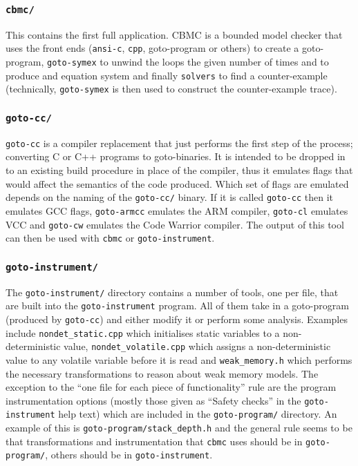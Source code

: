 \documentclass{article}
\newcommand{\dir}[1]{\texttt{#1}}
\newcommand{\file}[1]{\texttt{#1}}
\newcommand{\prog}[1]{\texttt{#1}}
\begin{document}
\subsubsection{\dir{cbmc/}}
\label{section:CBMC}

This contains the first full application.  CBMC is a bounded model
checker that uses the front ends (\dir{ansi-c}, \dir{cpp}, goto-program or others)
to create a goto-program, \dir{goto-symex} to unwind the loops the given
number of times and to produce and equation system and finally
\dir{solvers} to find a counter-example (technically, \dir{goto-symex}
is then used to construct the counter-example trace).



\subsubsection{\dir{goto-cc/}}
\label{section:goto-cc}
 
\dir{goto-cc} is a compiler replacement that just performs the first
step of the process; converting C or C++ programs to goto-binaries.
It is intended to be dropped in to an existing build procedure in
place of the compiler, thus it emulates flags that would affect the
semantics of the code produced.  Which set of flags are emulated
depends on the naming of the \dir{goto-cc/} binary.  If it is called
\prog{goto-cc} then it emulates GCC flags, \prog{goto-armcc} emulates
the ARM compiler, \prog{goto-cl} emulates VCC and \prog{goto-cw}
emulates the Code Warrior compiler.  The output of this tool can then
be used with \prog{cbmc} or \prog{goto-instrument}.




\subsubsection{\dir{goto-instrument/}}
\label{section:goto-instrument}

The \dir{goto-instrument/} directory contains a number of tools, one
per file, that are built into the \prog{goto-instrument} program.  All
of them take in a goto-program (produced by \prog{goto-cc}) and either
modify it or perform some analysis.  Examples include
\file{nondet\_static.cpp} which initialises static variables to a
non-deterministic value, \file{nondet\_volatile.cpp} which assigns
a non-deterministic value to any volatile variable before it is read
and \file{weak\_memory.h} which performs the necessary transformations
to reason about weak memory models.  The exception to the ``one file
for each piece of functionality'' rule are the program instrumentation
options (mostly those given as ``Safety checks'' in the
\prog{goto-instrument} help text) which are included in the
\prog{goto-program/} directory.  An example of this is
\file{goto-program/stack\_depth.h} and the general rule seems to be
that transformations and instrumentation that \prog{cbmc} uses should
be in \dir{goto-program/}, others should be in \dir{goto-instrument}.
\end{document}
